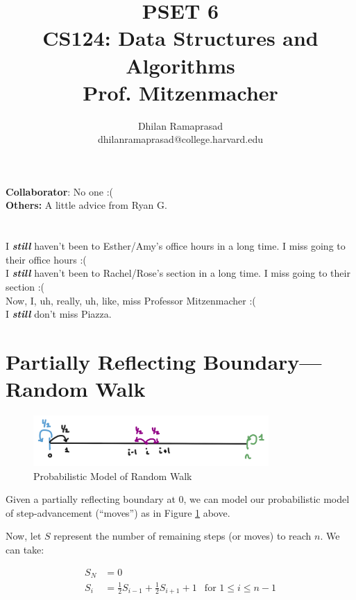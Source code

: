 \documentclass[conference]{styles/acmsiggraph}
\title{\huge PSET 6 \\ \LARGE {CS124: Data Structures and Algorithms \\ Prof. Mitzenmacher}}
\author{\Large Dhilan Ramaprasad \\ dhilanramaprasad@college.harvard.edu}
\newcommand{\?}{\stackrel{?}{=}}
\DeclareRobustCommand{\myalignbox}[2][gray!20]{%
\begin{tcolorbox}[   %
        breakable,
        left=0pt,
        right=0pt,
        top=0pt,
        bottom=12pt,
        colback=#1,
        colframe=#1,
        width=\dimexpr\textwidth\relax, 
        enlarge left by=0mm,
        boxsep=5pt,
        arc=0pt,outer arc=0pt,
        ]
        #2
\end{tcolorbox}
}
\begin{document}
\maketitle

\textbf{Collaborator}: No one :( \\
\textbf{Others:} A little advice from Ryan G. \\
\\ \\
I \textbf{\textit{still}} haven't been to Esther/Amy's office hours in a long time.  I miss going to their office hours :( \\
I \textbf{\textit{still}} haven't been to Rachel/Rose's section in a long time.  I miss going to their section :( \\

Now, I, uh, really, uh, like, miss Professor Mitzenmacher :( \\

I \textbf{\textit{still}} don't miss Piazza.

\newpage


\section{Partially Reflecting Boundary---Random Walk}

\begin{figure}[h!]
    \centering
    \includegraphics[width=0.8\textwidth]{Q1.png}
    \caption{Probabilistic Model of Random Walk}
    \label{fig:Q1Model}
\end{figure}
\FloatBarrier

Given a partially reflecting boundary at $0$, we can model our probabilistic model of step-advancement (\enquote{moves}) as in Figure \ref{fig:Q1Model} above.

Now, let $S$ represent the number of remaining steps (or moves) to reach $n$.  We can take:

\myalignbox{
\begin{align}
    S_N &= 0\\
    S_i &= \frac{1}{2}S_{i-1} + \frac{1}{2}S_{i+1} + 1 & \text{for } 1 \leq i \leq n-1
\end{align}}
\end{document}
